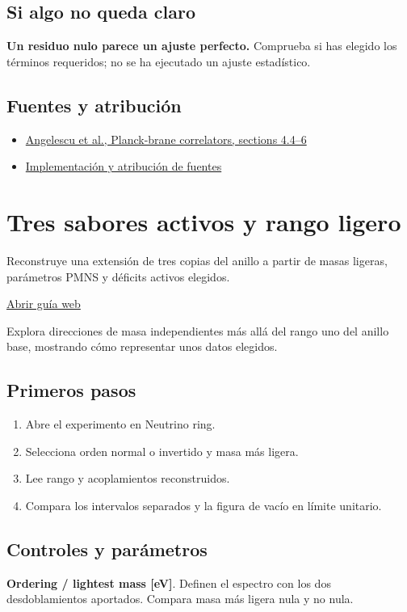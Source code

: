 \documentclass[11pt,a4paper]{article}
\begin{document}
\subsection*{Si algo no queda claro}
\textbf{Un residuo nulo parece un ajuste perfecto.} Comprueba si has elegido los términos requeridos; no se ha ejecutado un ajuste estadístico.

\subsection*{Fuentes y atribución}
\begin{itemize}
\item \href{https://arxiv.org/abs/2512.22094}{Angelescu et al., Planck-brane correlators, sections 4.4--6}
\item \href{https://github.com/karlesmarin/ghu-lab/blob/main/src/modules/rs_unification.mjs}{Implementación y atribución de fuentes}
\end{itemize}
\section{Tres sabores activos y rango ligero}
Reconstruye una extensión de tres copias del anillo a partir de masas ligeras, parámetros PMNS y déficits activos elegidos.

\href{https://karlesmarin.github.io/ghu-explorer/guide/es/flavour/index.html}{Abrir guía web}

Explora direcciones de masa independientes más allá del rango uno del anillo base, mostrando cómo representar unos datos elegidos.
\subsection*{Primeros pasos}
\begin{enumerate}
\item Abre el experimento en Neutrino ring.
\item Selecciona orden normal o invertido y masa más ligera.
\item Lee rango y acoplamientos reconstruidos.
\item Compara los intervalos separados y la figura de vacío en límite unitario.
\end{enumerate}
\subsection*{Controles y parámetros}
\textbf{Ordering / lightest mass [eV]}. Definen el espectro con los dos desdoblamientos aportados. Compara masa más ligera nula y no nula.
\end{document}
